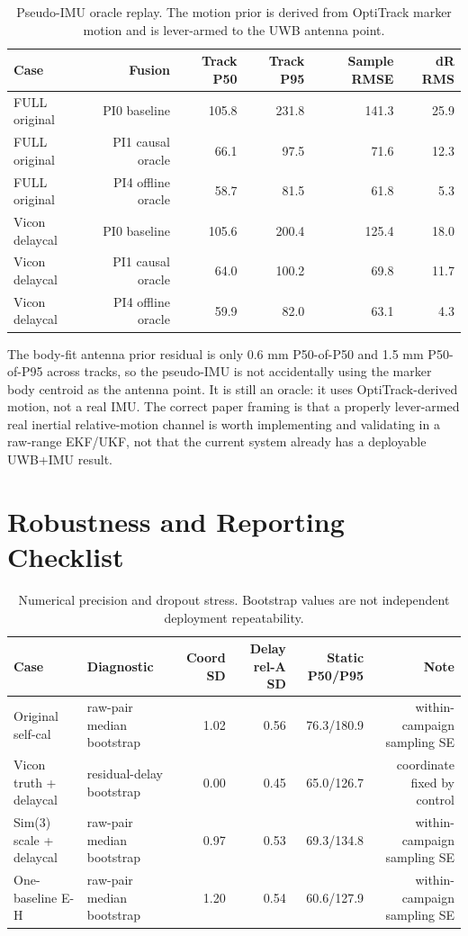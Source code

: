 \documentclass[11pt,a4paper]{article}
\newcommand{\tight}{\setlength{\tabcolsep}{4pt}\renewcommand{\arraystretch}{1.12}}
\begin{document}
\begin{table}[H]
\centering
\tight
\caption{Pseudo-IMU oracle replay.  The motion prior is derived from OptiTrack
marker motion and is lever-armed to the UWB antenna point.}
\begin{tabular}{lrrrrr}
\toprule
Case & Fusion & Track P50 & Track P95 & Sample RMSE & dR RMS \\
\midrule
FULL original & PI0 baseline & 105.8 & 231.8 & 141.3 & 25.9 \\
FULL original & PI1 causal oracle & 66.1 & 97.5 & 71.6 & 12.3 \\
FULL original & PI4 offline oracle & 58.7 & 81.5 & 61.8 & 5.3 \\
Vicon delaycal & PI0 baseline & 105.6 & 200.4 & 125.4 & 18.0 \\
Vicon delaycal & PI1 causal oracle & 64.0 & 100.2 & 69.8 & 11.7 \\
Vicon delaycal & PI4 offline oracle & 59.9 & 82.0 & 63.1 & 4.3 \\
\bottomrule
\end{tabular}
\end{table}

The body-fit antenna prior residual is only 0.6 mm P50-of-P50 and 1.5 mm
P50-of-P95 across tracks, so the pseudo-IMU is not accidentally using the marker
body centroid as the antenna point.  It is still an oracle: it uses OptiTrack-derived
motion, not a real IMU.  The correct paper framing is that a properly lever-armed
real inertial relative-motion channel is worth implementing and validating in a
raw-range EKF/UKF, not that the current system already has a deployable UWB+IMU
result.

\section{Robustness and Reporting Checklist}

\begin{table}[H]
\centering
\tight
\caption{Numerical precision and dropout stress.  Bootstrap values are not independent
deployment repeatability.}
\begin{tabularx}{\textwidth}{lXrrrr}
\toprule
Case & Diagnostic & Coord SD & Delay rel-A SD & Static P50/P95 & Note \\
\midrule
Original self-cal & raw-pair median bootstrap & 1.02 & 0.56 & 76.3/180.9 & within-campaign sampling SE \\
Vicon truth + delaycal & residual-delay bootstrap & 0.00 & 0.45 & 65.0/126.7 & coordinate fixed by control \\
Sim(3) scale + delaycal & raw-pair median bootstrap & 0.97 & 0.53 & 69.3/134.8 & within-campaign sampling SE \\
One-baseline E-H & raw-pair median bootstrap & 1.20 & 0.54 & 60.6/127.9 & within-campaign sampling SE \\
\bottomrule
\end{tabularx}
\end{table}
\end{document}
